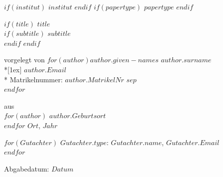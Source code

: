 




\pagestyle{scrheadings}

  \clearscrheadfoot
  \ihead[]{\headmark} %
  \chead[]{} %
  \ohead{} %
  \ofoot[]{\pagemark} %
  \setheadsepline{.2pt}
  \setfootsepline{.2pt}



\begin{titlepage}
\begin {center}
\sffamily
\setlength\parindent{0pt}


\vfill
$if(institut)$ $institut$
$endif$
\vfill
$if(papertype)$ \Large $papertype$
$endif$
\vfill

$if(title)$
{\huge \bfseries $title$} \\[1ex]
$if(subtitle)$
{\Large \bfseries $subtitle$} \\[1cm]
$endif$
$endif$

\normalsize vorgelegt von
\vfill
$for(author)$\Large $author.given-names$ $author.surname$\\*[1ex]
\normalsize $author.Email$\\*
Matrikelnummer: $author.MatrikelNr$ $sep$\\[1cm]
$endfor$

\vfill
aus\\
$for(author)$ $author.Geburtsort$\\
$endfor$
\vfill
$Ort$, $Jahr$
\vfill

$for(Gutachter)$
$Gutachter.type$: $Gutachter.name$, $Gutachter.Email$\\
$endfor$

\vfill

Abgabedatum: $Datum$
\end{center}
\end{titlepage}



\makeatletter
{}
\makeatletter


